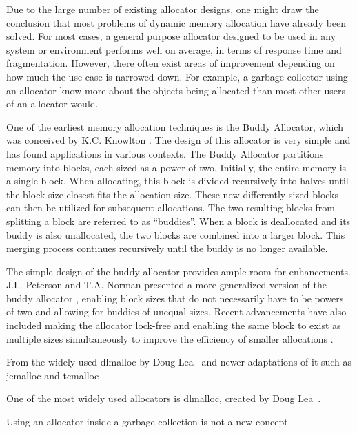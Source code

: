 Due to the large number of existing allocator designs, one might draw the conclusion that most problems of dynamic memory allocation have already been solved. For most cases, a general purpose allocator designed to be used in any system or environment performs well on average, in terms of response time and fragmentation. However, there often exist areas of improvement depending on how much the use case is narrowed down. For example, a garbage collector using an allocator know more about the objects being allocated than most other users of an allocator would.

One of the earliest memory allocation techniques is the Buddy Allocator, which was conceived by K.C. Knowlton \cite{buddy}. The design of this allocator is very simple and has found applications in various contexts. The Buddy Allocator partitions memory into blocks, each sized as a power of two. Initially, the entire memory is a single block. When allocating, this block is divided recursively into halves until the block size closest fits the allocation size. These new differently sized blocks can then be utilized for subsequent allocations. The two resulting blocks from splitting a block are referred to as ``buddies''. When a block is deallocated and its buddy is also unallocated, the two blocks are combined into a larger block. This merging process continues recursively until the buddy is no longer available.

The simple design of the buddy allocator provides ample room for enhancements. J.L. Peterson and T.A. Norman presented a more generalized version of the buddy allocator \cite{genbuddy}, enabling block sizes that do not necessarily have to be powers of two and allowing for buddies of unequal sizes. Recent advancements have also included making the allocator lock-free \cite{nbbs} and enabling the same block to exist as multiple sizes simultaneously to improve the efficiency of smaller allocations \cite{park2014ibuddy}.



From the widely used dlmalloc by Doug Lea~\cite{dlmalloc} and newer adaptations of it such as jemalloc and tcmalloc

One of the most widely used allocators is dlmalloc, created by Doug Lea~\cite{dlmalloc}. 


Using an allocator inside a garbage collection is not a new concept.

